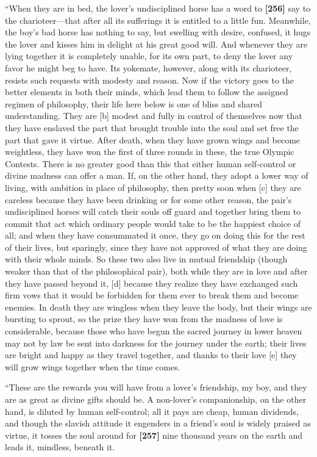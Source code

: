 “When they are in bed, the lover's undisciplined horse has a word to
{\bf {[}256{]}} say to the charioteer---that after all its sufferings it
is entitled to a little fun. Meanwhile, the boy's bad horse has nothing
to say, but swelling with desire, confused, it hugs the lover and kisses
him in delight at his great good will. And whenever they are lying
together it is completely unable, for its own part, to deny the lover
any favor he might beg to have. Its yokemate, however, along with its
charioteer, resists such requests with modesty and reason. Now if the
victory goes to the better elements in both their minds, which lead them
to follow the assigned regimen of philosophy, their life here below is
one of bliss and shared understanding. They are {[}b{]} modest and fully
in control of themselves now that they have enslaved the part that
brought trouble into the soul and set free the part that gave it virtue.
After death, when they have grown wings and become weightless, they have
won the first of three rounds in these, the true Olympic Contests. There
is no greater good than this that either human self-control or divine
madness can offer a man. If, on the other hand, they adopt a lower way
of living, with ambition in place of philosophy, then pretty soon when
{[}c{]} they are careless because they have been drinking or for some
other reason, the pair's undisciplined horses will catch their souls off
guard and together bring them to commit that act which ordinary people
would take to be the happiest choice of all; and when they have
consummated it once, they go on doing this for the rest of their lives,
but sparingly, since they have not approved of what they are doing with
their whole minds. So these two also live in mutual friendship (though
weaker than that of the philosophical pair), both while they are in love
and after they have passed beyond it, {[}d{]} because they realize they
have exchanged such firm vows that it would be forbidden for them ever
to break them and become enemies. In death they are wingless when they
leave the body, but their wings are bursting to sprout, so the prize
they have won from the madness of love is considerable, because those
who have begun the sacred journey in lower heaven may not by law be sent
into darkness for the journey under the earth; their lives are bright
and happy as they travel together, and thanks to their love {[}e{]} they
will grow wings together when the time comes.

“These are the rewards you will have from a lover's friendship, my boy,
and they are as great as divine gifts should be. A non-lover's
companionship, on the other hand, is diluted by human self-control; all
it pays are cheap, human dividends, and though the slavish attitude it
engenders in a friend's soul is widely praised as virtue, it tosses the
soul around for {\bf {[}257{]}} nine thousand years on the earth and
leads it, mindless, beneath it.

